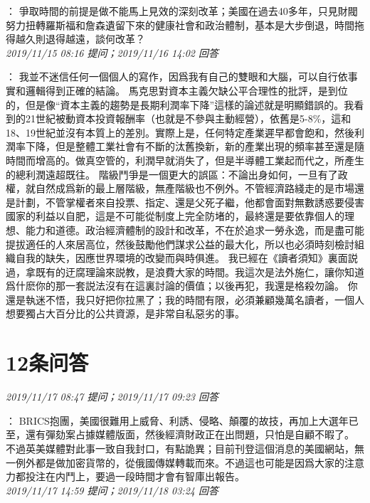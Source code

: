 \documentclass[twocolumn]{ctexart}
\begin{document}
：
爭取時間的前提是做不能馬上見效的深刻改革；美國在過去40多年，只見財閥努力扭轉羅斯福和詹森遺留下來的健康社會和政治體制，基本是大步倒退，時間拖得越久則退得越遠，談何改革？
\\

\textit{\hfill\noindent\small 2019/11/15 08:16 提问；2019/11/16 14:02 回答}

：
我並不迷信任何一個個人的寫作，因爲我有自己的雙眼和大腦，可以自行依事實和邏輯得到正確的結論。 
馬克思對資本主義欠缺公平合理性的批評，是到位的，但是像“資本主義的趨勢是長期利潤率下降”這樣的論述就是明顯錯誤的。我看到的21世紀被動資本投資報酬率（也就是不參與主動經營），依舊是5-8\%，這和18、19世紀並沒有本質上的差別。實際上是，任何特定產業遲早都會飽和，然後利潤率下降，但是整體工業社會有不斷的汰舊換新，新的產業出現的頻率甚至還是隨時間而增高的。做真空管的，利潤早就消失了，但是半導體工業起而代之，所產生的總利潤遠超既往。 
階級鬥爭是一個更大的誤區：不論出身如何，一旦有了政權，就自然成爲新的最上層階級，無產階級也不例外。不管經濟路綫走的是市場還是計劃，不管掌權者來自投票、指定、還是父死子繼，他都會面對無數誘惑要侵害國家的利益以自肥，這是不可能從制度上完全防堵的，最終還是要依靠個人的理想、能力和道德。政治經濟體制的設計和改革，不在於追求一勞永逸，而是盡可能提拔適任的人來居高位，然後鼓勵他們謀求公益的最大化，所以也必須時刻檢討組織自我的缺失，因應世界環境的改變而與時俱進。 
我已經在《讀者須知》裏面説過，拿既有的迂腐理論來説教，是浪費大家的時間。我這次是法外施仁，讓你知道爲什麽你的那一套説法沒有在這裏討論的價值；以後再犯，我還是格殺勿論。 
你還是執迷不悟，我只好把你拉黑了；我的時間有限，必須兼顧幾萬名讀者，一個人想要獨占大百分比的公共資源，是非常自私惡劣的事。
\\

\section{12条问答}

\textit{\hfill\noindent\small 2019/11/17 08:47 提问；2019/11/17 09:23 回答}

：
BRICS抱團，美國很難用上威脅、利誘、侵略、顛覆的故技，再加上大選年已至，還有彈劾案占據媒體版面，然後經濟財政正在出問題，只怕是自顧不暇了。 
不過英美媒體對此事一致自我封口，有點詭異；目前刊登這個消息的美國網站，無一例外都是做加密貨幣的，從俄國傳媒轉載而來。不過這也可能是因爲大家的注意力都投注在内鬥上，要過一段時間才會有智庫出報告。
\\

\textit{\hfill\noindent\small 2019/11/17 14:59 提问；2019/11/18 03:24 回答}
\end{document}
